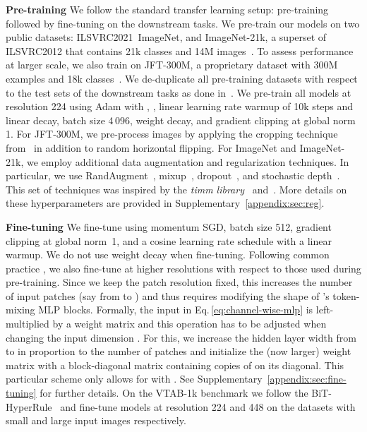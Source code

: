 {\bf Pre-training\;\;}
We follow the standard transfer learning setup: pre-training followed by fine-tuning on the downstream tasks.
We pre-train our models on two public datasets: 
ILSVRC2021~ImageNet, and ImageNet-21k, a superset of ILSVRC2012 that contains 21k classes and 14M images~\cite{deng2009-imagenet}.
To assess performance at 
larger scale, we also train on JFT-300M, a proprietary dataset with 300M examples and 18k classes~\citep{sun2017-jft}.
We de-duplicate all pre-training datasets with respect to the test sets of the downstream tasks as done in~\citet{Dosovitskiy2021,kolesnikov2020-bit}.
We pre-train all models at resolution 224
using Adam with , ,
linear learning rate warmup of 10k steps and linear decay,
batch size 4\,096,
weight decay,
and gradient clipping at global norm 1.
For JFT-300M, we pre-process images by applying the cropping technique from~\citet{szegedy15inception} in addition to random horizontal flipping.
For ImageNet and ImageNet-21k, we employ additional data augmentation and regularization techniques. In particular, we use RandAugment~\cite{cubuk2020rand}, mixup~\cite{zhang2018mixup}, dropout~\cite{srivastava14dropout}, and stochastic depth~\cite{huang2016deep}. 
This set of techniques was inspired by the \emph{timm library}~\cite{rw2019timm} and~\citet{touvron2019}. 
More details on these hyperparameters are provided in Supplementary~\ref{appendix:sec:reg}.

{\bf Fine-tuning\;\;}
We fine-tune using momentum SGD, batch size 512,
gradient clipping at global norm~1,
and a cosine learning rate schedule with a linear warmup. 
We do not use weight decay when fine-tuning.
Following common practice \cite{kolesnikov2020-bit,touvron2019}, we also fine-tune at higher resolutions with respect to those used during pre-training.
Since we keep the patch resolution fixed, this increases the number of input patches (say from  to ) and thus requires modifying the shape of \name{}'s token-mixing MLP blocks.
Formally, the input in Eq.\,\eqref{eq:channel-wise-mlp} is left-multiplied by a weight matrix  and this operation has to be adjusted when changing the input dimension .
For this, we increase the hidden layer width from  to  in proportion to the number of patches and initialize the (now larger) weight matrix  with a block-diagonal matrix containing copies of  on its diagonal. 
This particular scheme only allows for  with .
See Supplementary~\ref{appendix:sec:fine-tuning} for further details.
On the VTAB-1k benchmark we follow the BiT-HyperRule~\cite{kolesnikov2020-bit} and fine-tune \name{} models at resolution 224 and 448 on the datasets with small and large input images respectively.

